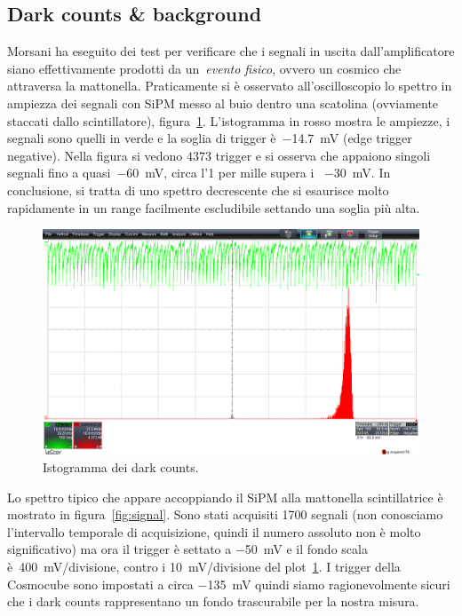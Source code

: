 \documentclass[11pt,a4paper]{article}
\begin{document}
    \subsection{Dark counts \& background}\label{subsec:dark-counts-&-background}
    Morsani ha eseguito dei test per verificare che i segnali in uscita dall'amplificatore siano effettivamente prodotti da un~\textit{evento fisico}, ovvero un cosmico che attraversa la mattonella.
    Praticamente si è osservato all'oscilloscopio lo spettro in ampiezza dei segnali con SiPM messo al buio dentro una scatolina (ovviamente staccati dallo scintillatore), figura~\ref{fig:dark}.
    L'istogramma in rosso mostra le ampiezze, i segnali sono quelli in verde e la soglia di trigger è~\SI{-14.7}{mV} (edge trigger negative).
    Nella figura si vedono $4373$ trigger e si osserva che appaiono singoli segnali fino a quasi~\SI{-60}{mV}, circa l'1 per mille supera i ~\SI{-30}{mV}.
    In conclusione, si tratta di uno spettro decrescente che si esaurisce molto rapidamente in un range facilmente escludibile settando una soglia più alta.

    \begin{figure}
        \centering
        \includegraphics[scale=0.3]{Immagini/dark_counts}
        \caption{Istogramma dei dark counts.}
        \label{fig:dark}
    \end{figure}

    Lo spettro tipico che appare accoppiando il SiPM alla mattonella scintillatrice è mostrato in figura~\ref{fig:signal}.
    Sono stati acquisiti 1700 segnali (non conosciamo l'intervallo temporale di acquisizione, quindi il numero assoluto non è molto significativo) ma ora il trigger è settato a \SI{-50}{mV} e il fondo scala è~\SI{400}{mV/divisione}, contro i \SI{10}{mV/divisione} del plot~\ref{fig:dark}.
    I trigger della Cosmocube sono impostati a circa \SI{-135}{mV} quindi siamo ragionevolmente sicuri che i dark counts rappresentano un fondo trascurabile per la nostra misura.
\end{document}
